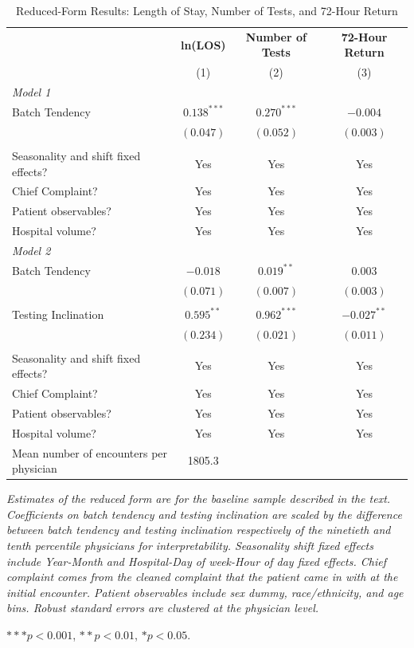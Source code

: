 \documentclass[,,nonblindrev]{informs}
\begin{document}
\begin{table}[htbp]
\centering
\caption{Reduced-Form Results: Length of Stay, Number of Tests, and 72-Hour Return}
\label{tab:reducedform}
\begin{tabular}{p{6cm}ccc}
\toprule
& \multicolumn{1}{c}{\textbf{ln(LOS)}}
& \multicolumn{1}{c}{\textbf{Number of Tests}}
& \multicolumn{1}{c}{\textbf{72-Hour Return}} \\
& \multicolumn{1}{c}{(1)}
& \multicolumn{1}{c}{(2)}
& \multicolumn{1}{c}{(3)} \\
\midrule
\textit{Model 1} & & & \\
Batch Tendency      & $0.138^{***}$ & $0.270^{***}$ & $-0.004$  \\
                    & $(0.047)$  & $(0.052)$     & $(0.003)$ \\
\\
Seasonality and shift fixed effects? & Yes & Yes & Yes \\
Chief Complaint? & Yes & Yes & Yes \\
Patient observables? & Yes & Yes & Yes \\
Hospital volume? & Yes & Yes & Yes \\
\midrule
\midrule
\textit{Model 2} & & & \\
Batch Tendency      & $-0.018$      & $0.019^{**}$ & $0.003$   \\
                    & $(0.071)$     & $(0.007)$     & $(0.003)$ \\
                    &     &     &  \\
Testing Inclination    & $0.595^{**}$  & $0.962^{***}$ & $-0.027^{**}$ \\
                    & $(0.234)$  & $(0.021)$     & $(0.011)$ \\
\\
Seasonality and shift fixed effects? & Yes & Yes & Yes \\
Chief Complaint? & Yes & Yes & Yes \\
Patient observables? & Yes & Yes & Yes \\
Hospital volume? & Yes & Yes & Yes \\
\midrule
Mean number of encounters per physician & 1805.3 &  &  \\
\midrule
\bottomrule
\end{tabular}
\begin{tablenotes}
\small
\item \textit{Estimates of the reduced form are for the baseline sample described in the text. Coefficients on batch tendency and testing inclination are scaled by the difference between batch tendency and testing inclination respectively of the ninetieth and tenth percentile physicians for interpretability. Seasonality shift fixed effects include Year-Month and Hospital-Day of week-Hour of day fixed effects. Chief complaint comes from the cleaned complaint that the patient came in with at the initial encounter. Patient observables include sex dummy, race/ethnicity, and age bins. Robust standard errors are clustered at the physician level.}
\item $*** p < 0.001$, $** p < 0.01$, $* p < 0.05$.
\end{tablenotes}
\end{table}
\end{document}
